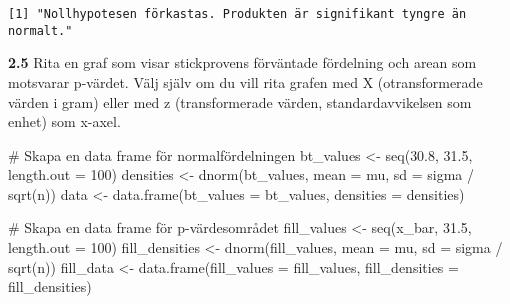 \documentclass[
  letterpaper,
  DIV=11,
  numbers=noendperiod]{scrartcl}
\newenvironment{Shaded}{\begin{snugshade}}{\end{snugshade}}
\newcommand{\AttributeTok}[1]{\textcolor[rgb]{0.40,0.45,0.13}{#1}}
\newcommand{\CommentTok}[1]{\textcolor[rgb]{0.37,0.37,0.37}{#1}}
\newcommand{\DecValTok}[1]{\textcolor[rgb]{0.68,0.00,0.00}{#1}}
\newcommand{\FloatTok}[1]{\textcolor[rgb]{0.68,0.00,0.00}{#1}}
\newcommand{\FunctionTok}[1]{\textcolor[rgb]{0.28,0.35,0.67}{#1}}
\newcommand{\NormalTok}[1]{\textcolor[rgb]{0.00,0.23,0.31}{#1}}
\newcommand{\OtherTok}[1]{\textcolor[rgb]{0.00,0.23,0.31}{#1}}
\newcommand{\SpecialCharTok}[1]{\textcolor[rgb]{0.37,0.37,0.37}{#1}}
\begin{document}
\begin{verbatim}
[1] "Nollhypotesen förkastas. Produkten är signifikant tyngre än normalt."
\end{verbatim}

\textbf{2.5} Rita en graf som visar stickprovens förväntade fördelning
och arean som motsvarar p-värdet. Välj själv om du vill rita grafen med
X (otransformerade värden i gram) eller med z (transformerade värden,
standardavvikelsen som enhet) som x-axel.

\begin{Shaded}
\begin{Highlighting}[]
\CommentTok{\# Skapa en data frame för normalfördelningen}
\NormalTok{bt\_values }\OtherTok{\textless{}{-}} \FunctionTok{seq}\NormalTok{(}\FloatTok{30.8}\NormalTok{, }\FloatTok{31.5}\NormalTok{, }\AttributeTok{length.out =} \DecValTok{100}\NormalTok{)}
\NormalTok{densities }\OtherTok{\textless{}{-}} \FunctionTok{dnorm}\NormalTok{(bt\_values, }\AttributeTok{mean =}\NormalTok{ mu, }\AttributeTok{sd =}\NormalTok{ sigma }\SpecialCharTok{/} \FunctionTok{sqrt}\NormalTok{(n))}
\NormalTok{data }\OtherTok{\textless{}{-}} \FunctionTok{data.frame}\NormalTok{(}\AttributeTok{bt\_values =}\NormalTok{ bt\_values, }\AttributeTok{densities =}\NormalTok{ densities)}

\CommentTok{\# Skapa en data frame för p{-}värdesområdet}
\NormalTok{fill\_values }\OtherTok{\textless{}{-}} \FunctionTok{seq}\NormalTok{(x\_bar, }\FloatTok{31.5}\NormalTok{, }\AttributeTok{length.out =} \DecValTok{100}\NormalTok{)}
\NormalTok{fill\_densities }\OtherTok{\textless{}{-}} \FunctionTok{dnorm}\NormalTok{(fill\_values, }\AttributeTok{mean =}\NormalTok{ mu, }\AttributeTok{sd =}\NormalTok{ sigma }\SpecialCharTok{/} \FunctionTok{sqrt}\NormalTok{(n))}
\NormalTok{fill\_data }\OtherTok{\textless{}{-}} \FunctionTok{data.frame}\NormalTok{(}\AttributeTok{fill\_values =}\NormalTok{ fill\_values, }\AttributeTok{fill\_densities =}\NormalTok{ fill\_densities)}


\end{Highlighting}
\end{Shaded}
\end{document}
